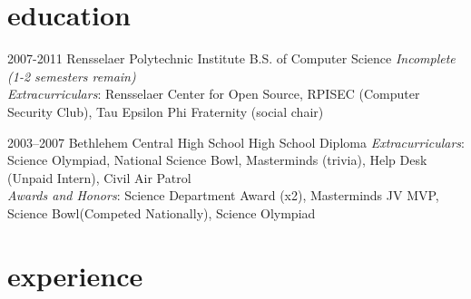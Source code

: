 \documentclass[]{friggeri-cv} %
\begin{document}
\section{education}

\begin{entrylist}


\entry
{2007-2011}
{Rensselaer Polytechnic Institute}
{B.S. of Computer Science}
{\emph{Incomplete (1-2 semesters remain)}
\\ \emph{Extracurriculars}: Rensselaer Center for Open Source, RPISEC (Computer Security Club), Tau Epsilon Phi Fraternity (social chair) }


\entry
{2003--2007}
{Bethlehem Central High School}
{High School Diploma}
{\emph{Extracurriculars}: Science Olympiad, National Science Bowl, Masterminds (trivia), Help Desk (Unpaid Intern), Civil Air Patrol
\\ \emph{Awards and Honors}: Science Department Award (x2), Masterminds JV MVP, Science Bowl(Competed Nationally), Science Olympiad}


\end{entrylist}


\section{experience}
\end{document}
